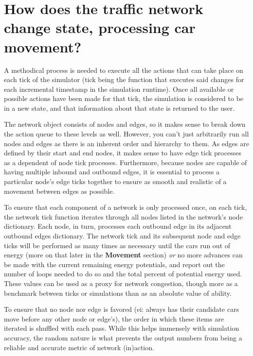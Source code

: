 
\section{How does the traffic network change state, processing car movement?}

\par A methodical process is needed to execute all the actions that can take place on each tick of the simulator (tick being the function that executes said changes for each incremental timestamp in the simulation runtime).  Once all available or possible actions have been made for that tick, the simulation is considered to be in a new state, and that information about that state is returned to the user. \\

\par The network object consists of nodes and edges, so it makes sense to break down the action queue to these levels as well.  However, you can't just arbitrarily run all nodes and edges as there is an inherent order and hierarchy to them.  As edges are defined by their start and end nodes, it makes sense to have edge tick processes as a dependent of node tick processes.  Furthermore, because nodes are capable of having multiple inbound and outbound edges, it is essential to process a particular node's edge ticks together to ensure as smooth and realistic of a movement between edges as possible. \\

\par To ensure that each component of a network is only processed once, on each tick, the network tick function iterates through all nodes listed in the network's node dictionary.  Each node, in turn, processes each outbound edge in its adjacent outbound edges dictionary.  The network tick and its subsequent node and edge ticks will be performed as many times as necessary until the cars run out of energy (more on that later in the \textbf{Movement} section) \textit{or} no more advances can be made with the current remaining energy potentials, and report out the number of loops needed to do so and the total percent of potential energy used.  These values can be used as a proxy for network congestion, though more as a benchmark between ticks or simulations than as an absolute value of ability. \\

\par To ensure that no node nor edge is favored (ei: always has their candidate cars move before any other node or edge's), the order in which these items are iterated is shuffled with each pass.  While this helps immensely with simulation accuracy, the random nature is what prevents the output numbers from being a reliable and accurate metric of network (in)action. 


